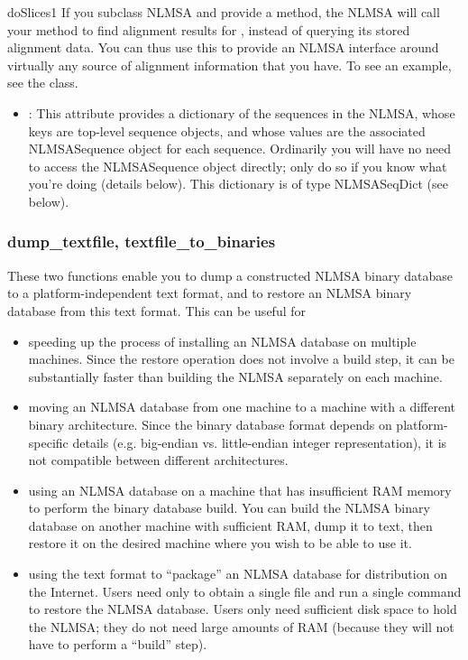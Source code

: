 \documentclass{howto}
\begin{document}
\begin{funcdesc}{doSlice}{s1}
  If you subclass NLMSA and provide a  method, the NLMSA will
  call your  method to find alignment results for ,
  instead of querying its stored alignment data.  You can thus use this 
  to provide an NLMSA interface around virtually any source of alignment information
  that you have.  To see an example, see the  class.  
\end{funcdesc}

\begin{itemize}
\item
{}: This attribute provides a dictionary of the sequences in
the NLMSA, whose keys are top-level sequence objects, and whose values are
the associated NLMSASequence object for each sequence.  Ordinarily you will have
no need to access the NLMSASequence object directly; only do so if you know what
you're doing (details below).  This dictionary is of type NLMSASeqDict (see below).

\end{itemize}

\subsubsection{dump_textfile, textfile_to_binaries}
These two functions enable you to dump a constructed NLMSA binary database
to a platform-independent text format, and to restore an NLMSA binary database
from this text format.  This can be useful for 
\begin{itemize}
\item speeding up the process of installing an NLMSA database on multiple
machines.  Since the restore operation does not involve a build step, it 
can be substantially faster than building the NLMSA separately on each machine.

\item moving an NLMSA database from one machine to a machine with a different
binary architecture.  Since the binary database format depends on platform-specific
details (e.g. big-endian vs. little-endian integer representation), it is not
compatible between different architectures.

\item using an NLMSA database on a machine that has insufficient RAM memory
to perform the binary database build.  You can build the NLMSA binary database
on another machine with sufficient RAM, dump it to text, then restore it on
the desired machine where you wish to be able to use it.

\item using the text format to ``package'' an NLMSA database for distribution
on the Internet.  Users need only to obtain a single file and run a single command
to restore the NLMSA database.  Users only need sufficient disk space to hold
the NLMSA; they do not need large amounts of RAM (because they will not have to
perform a ``build'' step).

\end{itemize}
\end{document}
